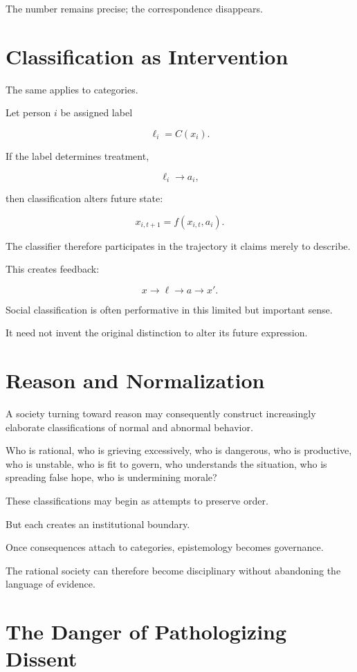 \documentclass[11pt,oneside]{book}
\theoremstyle{definition}
\theoremstyle{remark}
\begin{document}
The number remains precise; the correspondence disappears.

\section{Classification as Intervention}

The same applies to categories.

Let person \(i\) be assigned label

\[
\ell_i=C(x_i).
\]

If the label determines treatment,

\[
\ell_i\rightarrow a_i,
\]

then classification alters future state:

\[
x_{i,t+1}
=
f(x_{i,t},a_i).
\]

The classifier therefore participates in the trajectory it claims merely to describe.

This creates feedback:

\[
x
\rightarrow
\ell
\rightarrow
a
\rightarrow
x'.
\]

Social classification is often performative in this limited but important sense.

It need not invent the original distinction to alter its future expression.

\section{Reason and Normalization}

A society turning toward reason may consequently construct increasingly elaborate classifications of normal and abnormal behavior.

Who is rational, who is grieving excessively, who is dangerous, who is productive, who is unstable, who is fit to govern, who understands the situation, who is spreading false hope, who is undermining morale?

These classifications may begin as attempts to preserve order.

But each creates an institutional boundary.

Once consequences attach to categories, epistemology becomes governance.

The rational society can therefore become disciplinary without abandoning the language of evidence.

\section{The Danger of Pathologizing Dissent}
\end{document}
